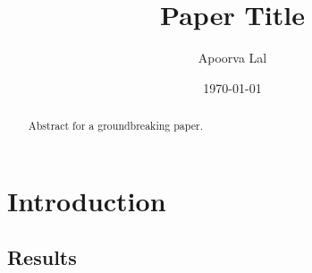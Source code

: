 \documentclass[12pt,reqno]{amsart} %
\title{Paper Title}
\author{Apoorva Lal}
\date{\today}
\begin{document}
\begin{abstract} Abstract for a groundbreaking paper.
\end{abstract}

\maketitle



\section{Introduction} \label{intro}

\subsection{Results}

\lipsum[5]


\renewcommand{\mkbibnamefamily}[1]{\textsc{#1}}
\printbibliography

\appendix


\medskip
\end{document}

